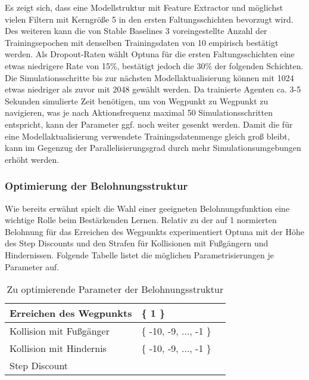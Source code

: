 Es zeigt sich, dass eine Modellstruktur mit Feature Extractor und möglichst vielen
Filtern mit Kerngröße 5 in den ersten Faltungsschichten bevorzugt wird. Des weiteren
kann die von Stable Baselines 3 voreingestellte Anzahl der Trainingsepochen
mit denselben Trainingsdaten von 10 empirisch bestätigt werden. Als Dropout-Raten
wählt Optuna für die ersten Faltungsschichten eine etwas niedrigere Rate von 15\%,
bestätigt jedoch die 30\% der folgenden Schichten. Die Simulationsschritte bis
zur nächsten Modellaktualisierung können mit 1024 etwas niedriger als zuvor mit 2048
gewählt werden. Da trainierte Agenten ca. 3-5 Sekunden simulierte Zeit benötigen,
um von Wegpunkt zu Wegpunkt zu navigieren, was je nach Aktionsfrequenz maximal 50
Simulationsschritten entspricht, kann der Parameter ggf. noch weiter gesenkt werden.
Damit die für eine Modellaktualisierung verwendete Trainingsdatenmenge gleich groß
bleibt, kann im Gegenzug der Parallelisierungsgrad durch mehr Simulationsumgebungen
erhöht werden.

\subsubsection{Optimierung der Belohnungsstruktur}
Wie bereits erwähnt spielt die Wahl einer geeigneten Belohnungsfunktion eine
wichtige Rolle beim Bestärkenden Lernen. Relativ zu der auf 1 normierten Belohnung
für das Erreichen des Wegpunkts experimentiert Optuna mit der Höhe des Step Discounts
und den Strafen für Kollisionen mit Fußgängern und Hindernissen. Folgende Tabelle
\label{tab:OptReward} listet die möglichen Parametrisierungen je Parameter auf.\\

\begin{table}[h]
  \centering
\begin{tabularx}{0.8\textwidth} { 
  | >{\raggedright\arraybackslash}X 
  | >{\centering\arraybackslash}X 
  | >{\raggedleft\arraybackslash}X | }
 \hline
 Erreichen des Wegpunkts & \{ 1 \} \\
 \hline
 Kollision mit Fußgänger & \{ -10, -9, ..., -1 \} \\
 \hline
 Kollision mit Hindernis & \{ -10, -9, ..., -1 \} \\
 \hline
 Step Discount & [ -1, 0 ] \\
 \hline
\end{tabularx}
\caption{Zu optimierende Parameter der Belohnungsstruktur}
\label{tab:OptReward}
\end{table}


